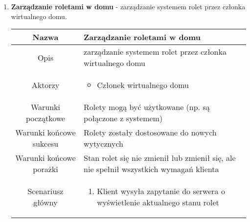 \documentclass{article}
\begin{document}
\begin{enumerate}
\begin{enumerate}
			\item \textbf{Zarządzanie roletami w domu} - zarządzanie systemem rolet
				przez członka wirtualnego domu.
				\begin{table}[H]
					\centering
					\begin{tabular}{|c|p{7cm}|}
						\hline
						Nazwa                   & \textbf{Zarządzanie roletami w domu}                                                                                                                                                                                                                          \\
						\hline
						Opis                    & zarządzanie systemem rolet przez członka wirtualnego domu                                                                                                                                                                                                     \\
						\hline
						Aktorzy                 & \begin{itemize}\item Członek wirtualnego domu\end{itemize}                                                                                                                                                                                                    \\
						\hline
						Warunki początkowe      & Rolety mogą być użytkowane (np. są połączone z systemem)                                                                                                                                                                                                      \\
						\hline
						Warunki końcowe sukcesu & Rolety zostały dostosowane do nowych wytycznych                                                                                                                                                                                                               \\
						\hline
						Warunki końcowe porażki & Stan rolet się nie zmienił lub zmienił się, ale nie spełnił wszystkich wymagań klienta                                                                                                                                                                        \\
						\hline
						Scenariusz główny       & \begin{enumerate}\item Klient wysyła zapytanie do serwera o wyświetlenie aktualnego stanu rolet


\end{enumerate}
\end{tabular}
\end{table}
\end{enumerate}
\end{enumerate}
\end{document}

